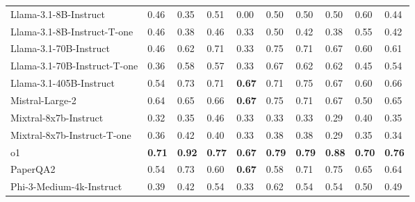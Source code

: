 \begin{tabular}{llllllllll}
Llama-3.1-8B-Instruct & 0.46 & 0.35 & 0.51 & 0.00 & 0.50 & 0.50 & 0.50 & 0.60 & 0.44 \\
Llama-3.1-8B-Instruct-T-one & 0.46 & 0.38 & 0.46 & 0.33 & 0.50 & 0.42 & 0.38 & 0.55 & 0.42 \\
Llama-3.1-70B-Instruct & 0.46 & 0.62 & 0.71 & 0.33 & 0.75 & 0.71 & 0.67 & 0.60 & 0.61 \\
Llama-3.1-70B-Instruct-T-one & 0.36 & 0.58 & 0.57 & 0.33 & 0.67 & 0.62 & 0.62 & 0.45 & 0.54 \\
Llama-3.1-405B-Instruct & 0.54 & 0.73 & 0.71 & \textbf{0.67} & 0.71 & 0.75 & 0.67 & 0.60 & 0.66 \\
Mistral-Large-2 & 0.64 & 0.65 & 0.66 & \textbf{0.67} & 0.75 & 0.71 & 0.67 & 0.50 & 0.65 \\
Mixtral-8x7b-Instruct & 0.32 & 0.35 & 0.46 & 0.33 & 0.33 & 0.33 & 0.29 & 0.40 & 0.35 \\
Mixtral-8x7b-Instruct-T-one & 0.36 & 0.42 & 0.40 & 0.33 & 0.38 & 0.38 & 0.29 & 0.35 & 0.34 \\
o1 & \textbf{0.71} & \textbf{0.92} & \textbf{0.77} & \textbf{0.67} & \textbf{0.79} & \textbf{0.79} & \textbf{0.88} & \textbf{0.70} & \textbf{0.76} \\
PaperQA2 & 0.54 & 0.73 & 0.60 & \textbf{0.67} & 0.58 & 0.71 & 0.75 & 0.65 & 0.64 \\
Phi-3-Medium-4k-Instruct & 0.39 & 0.42 & 0.54 & 0.33 & 0.62 & 0.54 & 0.54 & 0.50 & 0.49 \\
\bottomrule
\end{tabular}
